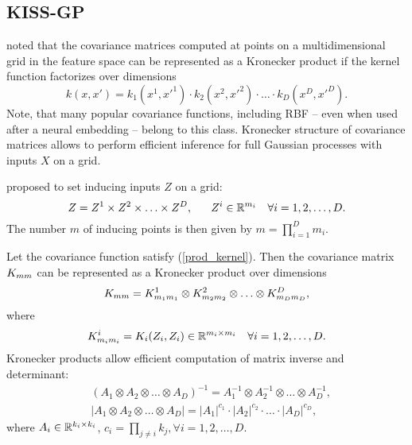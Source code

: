 \subsection{KISS-GP}
\label{kiss_gp}

  \citet{saatci2012} noted that the covariance matrices computed at points on a
  multidimensional grid in the feature space can be represented as a Kronecker
  product if the kernel function factorizes over dimensions
  \begin{equation}
  \label{prod_kernel}
    k(x, x') = k_1(x^1, x'^1)\cdot k_2(x^2, x'^2)\cdot \ldots\cdot k_D(x^D, x'^D).
  \end{equation}
  Note, that many popular covariance functions, including RBF -- even when used after a neural embedding -- belong to this class.
  Kronecker structure of covariance matrices allows to perform efficient inference
  for full Gaussian processes with inputs $X$ on a grid.

  \citet{wilson2015} proposed to set inducing inputs $Z$ on a grid:
  \[
    Z = Z^1 \times Z^2 \times \ldots \times Z^D,~~~~~Z^i \in \mathbb{R}^{m_i}~~~\forall i = 1, 2, \ldots, D.
  \]
  The number $m$ of inducing points is then given by $m = \prod_{i=1}^D m_{i}$.

  Let the covariance function satisfy (\ref{prod_kernel}). Then the covariance
  matrix $K_{mm}$ can be represented as a Kronecker product over dimensions
  \[
    K_{mm} = K_{m_1 m_1}^1 \otimes K^2_{m_2 m_2} \otimes \ldots \otimes
    K^D_{m_D m_D},
  \]
  where
  \[
    K^i_{m_i m_i} = K_i(Z_i, Z_i) \in \mathbb{R}^{m_i \times m_i}~~~\forall i = 1, 2, \ldots, D.
  \]
  Kronecker products allow efficient computation of matrix inverse and determinant:
  \begin{align*}
    &(A_1 \otimes A_2 \otimes \ldots \otimes A_D)^{-1} = A_1^{-1} \otimes A_2^{-1} \otimes \ldots \otimes A_D^{-1},\\
    &|A_1 \otimes A_2 \otimes \ldots \otimes A_D| = |A_1|^{c_1} \cdot |A_2|^{c_2} \cdot \ldots \cdot |A_D|^{c_D},
  \end{align*}
  where $A_i\in\mathbb{R}^{k_i \times k_i}$, $c_i = \prod_{j \ne i} k_j,\forall i = 1, 2, \ldots, D$.
  

